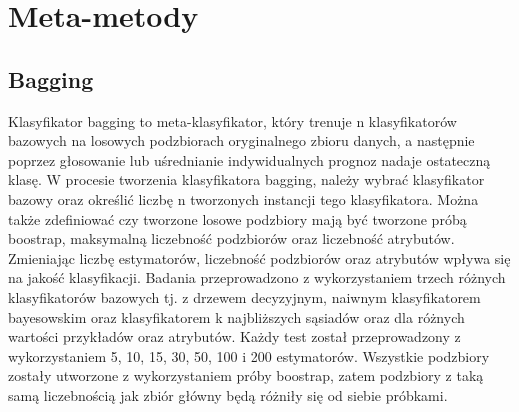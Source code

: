 \chapter{Meta-metody}
\section{Bagging}
Klasyfikator bagging to meta-klasyfikator, który trenuje n klasyfikatorów bazowych na losowych podzbiorach oryginalnego zbioru danych, a następnie poprzez głosowanie lub uśrednianie indywidualnych prognoz nadaje ostateczną klasę. W procesie tworzenia klasyfikatora bagging, należy wybrać klasyfikator bazowy oraz określić liczbę n tworzonych instancji tego klasyfikatora. Można także zdefiniować czy tworzone losowe podzbiory mają być tworzone próbą boostrap, maksymalną liczebność podzbiorów oraz liczebność atrybutów. Zmieniając liczbę estymatorów, liczebność podzbiorów oraz atrybutów wpływa się na jakość klasyfikacji. Badania przeprowadzono z wykorzystaniem trzech różnych klasyfikatorów bazowych tj. z drzewem decyzyjnym, naiwnym klasyfikatorem bayesowskim oraz klasyfikatorem k najbliższych sąsiadów oraz dla różnych wartości przykładów oraz atrybutów. Każdy test został przeprowadzony z wykorzystaniem 5, 10, 15, 30, 50, 100 i 200 estymatorów. Wszystkie podzbiory zostały utworzone z wykorzystaniem próby boostrap, zatem podzbiory z taką samą liczebnością jak zbiór główny będą różniły się od siebie próbkami.
  
